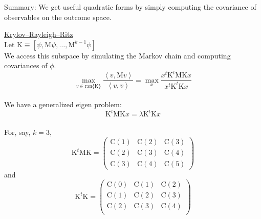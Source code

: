 \documentclass{slides}
\newcommand{\M}{\mbox{M}}
\newcommand{\C}{\mbox{C}}
\newcommand{\K}{\mbox{K}}
\newcommand{\ran}{\mbox{ran}}
\begin{document}
\begin{note}
Summary: We get useful quadratic forms by simply computing the
covariance of observables on the outcome space.
\end{note}

\begin{slide}
\underline{Krylov--Rayleigh--Ritz}\\
Let $\K \equiv  [\psi ,\M\psi ,\ldots,\M^{k-1}\psi ]$\\
We access this subspace by simulating the Markov chain 
and computing covariances of $\phi$.  
\[\max_{v \in \ran\{\K\}}\frac{\left< v,\M v \right>}{\left<v,v\right>} 
= \max_x \frac{x^t \K^t \M \K x }{x^t \K^t \K x} 
\]
\\
We have a generalized eigen problem:
\begin{equation} \K^t \M \K x = \lambda \K^t \K x 
\end{equation}
\\
For, say, $k=3$,
\[\K^t \M \K = 
\left(
\begin{array}{ccc}
\C(1) & \C(2) & \C(3)\\
\C(2) & \C(3) & \C(4)\\
\C(3) & \C(4) & \C(5)
\end{array}\right)\]
and
\[\K^t \K = 
\left(
\begin{array}{ccc}
\C(0) & \C(1) & \C(2) \\
\C(1) & \C(2) & \C(3)\\
\C(2) & \C(3) & \C(4)\\
\end{array}\right)\]
\end{slide}
\end{document}
